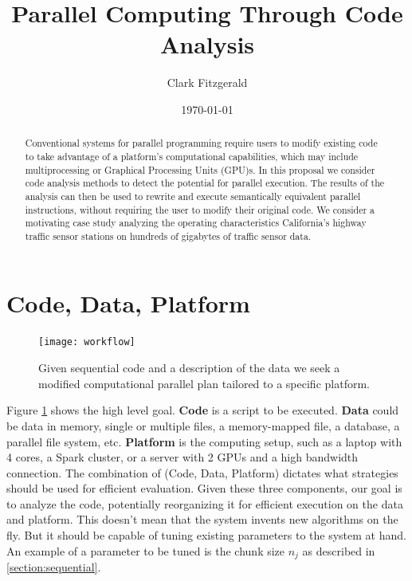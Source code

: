 \documentclass[12pt]{article}
\begin{document}
\title{Parallel Computing Through Code Analysis}
\date{\today}
\author{Clark Fitzgerald}
\maketitle

\begin{abstract}


    Conventional systems for parallel programming require users to modify
    existing code to take advantage of a platform's computational
    capabilities, which may include multiprocessing or Graphical Processing
    Units (GPU)s. In this proposal we consider code analysis methods to
    detect the potential for parallel execution. The results of the
    analysis can then be used to rewrite and execute semantically
    equivalent parallel instructions, without requiring the user to modify
    their original code.  We consider a motivating case study analyzing the
    operating characteristics California's highway traffic sensor stations
    on hundreds of gigabytes of traffic sensor data.

\end{abstract}

\section{Code, Data, Platform}

\begin{figure}
\centering
\texttt{[image: workflow]}
\caption{Given sequential code and a description of the data we seek
    a modified computational parallel plan tailored to a specific platform.}
\label{fig:workflow}
\end{figure}

Figure \ref{fig:workflow} shows the high level goal.
\textbf{Code} is a script to be executed.
\textbf{Data} could be data in memory, single or multiple files, a
memory-mapped file, a database, a parallel file system, etc.
\textbf{Platform} is the computing setup, such as a laptop with 4 cores, a
Spark cluster, or a server with 2 GPUs and a high bandwidth connection. The combination
of (Code, Data, Platform) dictates what strategies should be used for
efficient evaluation. Given these three components, our goal is to analyze the
code, potentially reorganizing it for efficient execution on the data and
platform. This doesn't mean that the system invents new algorithms on
the fly. But it should be capable of tuning existing parameters to the
system at hand. An example of a parameter to be tuned is the chunk size
$n_j$ as described in \ref{section:sequential}.
\end{document}
